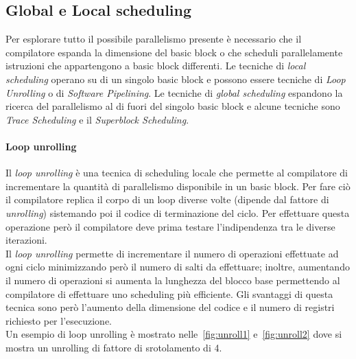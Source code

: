 \subsection{Global e Local scheduling}
Per esplorare tutto il possibile parallelismo presente è necessario che il compilatore espanda la dimensione del basic block o che scheduli parallelamente istruzioni che appartengono a basic block differenti.
Le tecniche di \emph{local scheduling}  operano su di un singolo basic block e possono essere tecniche di \emph{Loop Unrolling} o di \emph{Software Pipelining}.
Le tecniche di \emph{global scheduling} espandono la ricerca del parallelismo al di fuori del singolo basic block e alcune tecniche sono \emph{Trace Scheduling} e il \emph{Superblock Scheduling}.\\
\paragraph{Loop unrolling}
Il \emph{loop unrolling} è una tecnica di scheduling locale che permette al compilatore di incrementare la quantità di parallelismo disponibile in un basic block. Per fare ciò il compilatore replica il corpo di un loop diverse volte (dipende dal fattore di \emph{unrolling}) sistemando poi il codice di terminazione del ciclo. Per effettuare questa operazione però il compilatore deve prima testare l'indipendenza tra le diverse iterazioni.\\
Il \emph{loop unrolling} permette di incrementare il numero di operazioni effettuate ad ogni ciclo minimizzando però il numero di salti da effettuare; inoltre, aumentando il numero di operazioni si aumenta la lunghezza del blocco base permettendo al compilatore di effettuare uno scheduling più efficiente. Gli svantaggi di questa tecnica sono però l'aumento della dimensione del codice e il numero di registri richiesto per l'esecuzione.\\
Un esempio di loop unrolling è mostrato nelle \figurename\,\ref{fig:unroll1} e \figurename\,\ref{fig:unroll2} dove si mostra un unrolling di fattore di srotolamento di 4.

